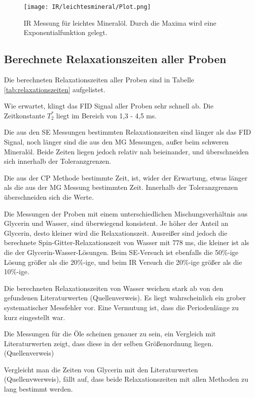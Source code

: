 \documentclass[10pt,twoside]{article}
\renewcommand{\1}{^{-1}}
\renewcommand{\2}{^{-2}}
\newcommand{\3}{^{-3}}
\newcommand{\4}{^{-4}}
\newcommand{\5}{^{-5}}
\newcommand{\6}{^{-6}}
\newcommand{\7}{^{-7}}
\newcommand{\8}{^{-8}}
\newcommand{\9}{^{-9}}
\begin{document}
\begin{figure}[H]
\centering
\texttt{[image: IR/leichtesmineral/Plot.png]} 
\caption{IR Messung für leichtes Mineralöl. Durch die Maxima wird eine Exponentialfunktion gelegt.}

\end{figure}
\newpage
\subsection{Berechnete Relaxationszeiten aller Proben}

Die berechneten Relaxationszeiten aller Proben sind in Tabelle \ref{tab:relaxationszeiten} aufgelistet.

Wie erwartet, klingt das FID Signal aller Proben sehr schnell ab. Die Zeitkonstante $T_2^*$ liegt im Bereich von 1,3 - 4,5 ms.

Die aus den SE Messungen bestimmten Relaxationszeiten sind länger als das FID Signal, noch länger sind die aus den MG Messungen, außer beim schweren Mineralöl. Beide Zeiten liegen jedoch relativ nah beieinander, und überschneiden sich innerhalb der Toleranzgrenzen.

Die aus der CP Methode bestimmte Zeit, ist, wider der Erwartung, etwas länger als die aus der MG Messung bestimmten Zeit. Innerhalb der Toleranzgrenzen überschneiden sich die Werte. 

Die Messungen der Proben mit einem unterschiedlichen Mischungsverhältnis aus Glycerin und Wasser, sind überwiegend konsistent. Je höher der Anteil an Glycerin, desto kleiner wird die Relaxationszeit. Ausreißer sind jedoch die berechnete Spin-Gitter-Relaxationszeit von Wasser mit 778 ms, die kleiner ist als die der Glycerin-Wasser-Lösungen.
Beim SE-Versuch ist ebenfalls die 50\%-ige Lösung größer als die 20\%-ige, und beim IR Versuch die 20\%-ige größer als die 10\%-ige.

Die berechneten Relaxationszeiten von Wasser weichen stark ab von den gefundenen Literaturwerten (Quellenverweis). Es liegt wahrscheinlich ein grober systematischer Messfehler vor. Eine Vermutung ist, dass die Periodenlänge zu kurz eingestellt war.

Die Messungen für die Öle scheinen genauer zu sein, ein Vergleich mit Literaturwerten zeigt, dass diese in der selben Größenordnung liegen. (Quellenverweis)

Vergleicht man die Zeiten von Glycerin mit den Literaturwerten (Quellenvwerweis), fällt auf, dass beide Relaxationszeiten mit allen Methoden zu lang bestimmt werden.
\end{document}
